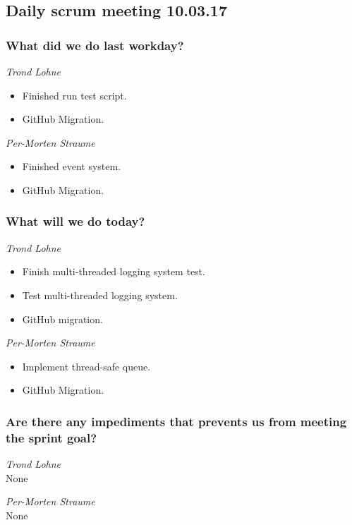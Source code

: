 \documentclass{article}
\begin{document}
\begin{center}
\subsection*{Daily scrum meeting 10.03.17}
\end{center}
\bigskip


\subsubsection*{What did we do last workday?}

\noindent\textit{Trond Lohne}
\begin{itemize}
	\item 
	Finished run test script.
	
	\item 
	GitHub Migration.
\end{itemize}

\medskip

\noindent\textit{Per-Morten Straume}
\begin{itemize}
	\item 
	Finished event system.

    \item
    GitHub Migration.
\end{itemize}


\subsubsection*{What will we do today?}

\noindent\textit{Trond Lohne}
\begin{itemize}
	\item 
	Finish multi-threaded logging system test.
	
	\item 
	Test multi-threaded logging system.
	
	\item 
	GitHub migration.
\end{itemize}

\medskip

\noindent\textit{Per-Morten Straume}
\begin{itemize}
	\item 
	Implement thread-safe queue.
	
    \item 
	GitHub Migration.
\end{itemize}


\subsubsection*{Are there any impediments that prevents us from meeting the sprint goal?}

\noindent\textit{Trond Lohne}\\
None

\medskip

\noindent\textit{Per-Morten Straume}\\
None
\end{document}

